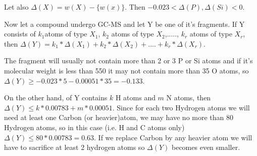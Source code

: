 Let also \begin{math}\Delta(X) = w(X) - \{w(x)\}\end{math}. Then \begin{math}-0.023
<\Delta(P), \Delta(Si) < 0\end{math}.

Now let a compound undergo GC-MS and let Y be one of it's fragments. If Y consists 
of \begin{math}k_{1}\end{math}atoms of type \begin{math}X_{1}\end{math}, 
\begin{math}k_{2}\end{math} atoms of type \begin{math}X_{2}\end{math},....., 
\begin{math}k_{r}\end{math} atoms of type \begin{math}X_{r}\end{math}, then
\begin{math}\Delta(Y) = k_{1}*\Delta(X_{1}) + k_{2}*\Delta(X_{2}) + ....+ k_{r}*
\Delta(X_{r})\end{math}.

The fragment will usually not contain more than 2 or 3 P or Si atoms and if it's 
molecular weight is less than 550 it may not contain more than 35 O atoms, so 
\begin{math}\Delta(Y) \geq -0.023*5 - 0.00051*35 = -0.133\end{math}.

On the other hand, of Y contains \begin{math}k\end{math} H atoms and \begin{math}m\end{math}
 N atoms, then \begin{math}\Delta(Y) \leq k*0.00783 + m*0.00051\end{math}. Since for each two 
Hydrogen atoms we will need at least one Carbon (or heavier)atom, we may have no more than
 80 Hydrogen atoms, so in this case (i.e. H and C atoms only)\begin{math}\Delta(Y) \leq 
80*0.00783 = 0.63\end{math}. If we replace Carbon by any heavier atom we will have to sacrifice 
at least 2 hydrogen atoms so \begin{math}\Delta(Y)\end{math} becomes even smaller.

